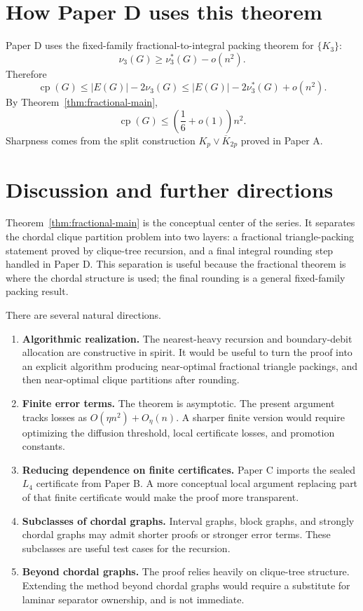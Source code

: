 \documentclass[11pt]{article}
\theoremstyle{definition}
\newcommand{\cp}{\operatorname{cp}}
\begin{document}
\section{How Paper D uses this theorem}

Paper D uses the fixed-family fractional-to-integral packing theorem for \(\{K_3\}\):
\[
    \nu_3(G)\ge\nu_3^*(G)-o(n^2).
\]
Therefore
\[
    \cp(G)
    \le
    |E(G)|-2\nu_3(G)
    \le
    |E(G)|-2\nu_3^*(G)+o(n^2).
\]
By Theorem~\ref{thm:fractional-main},
\[
    \cp(G)
    \le
    \left(\frac16+o(1)\right)n^2.
\]
Sharpness comes from the split construction \(K_p\vee\overline{K}_{2p}\) proved in Paper A.


\section{Discussion and further directions}

Theorem~\ref{thm:fractional-main} is the conceptual center of the series. It separates the chordal clique partition problem into two layers: a fractional triangle-packing statement proved by clique-tree recursion, and a final integral rounding step handled in Paper D. This separation is useful because the fractional theorem is where the chordal structure is used; the final rounding is a general fixed-family packing result.

There are several natural directions.

\begin{enumerate}[label=(\roman*)]
    \item \textbf{Algorithmic realization.} The nearest-heavy recursion and boundary-debit allocation are constructive in spirit. It would be useful to turn the proof into an explicit algorithm producing near-optimal fractional triangle packings, and then near-optimal clique partitions after rounding.
    \item \textbf{Finite error terms.} The theorem is asymptotic. The present argument tracks losses as \(O(\eta n^2)+O_\eta(n)\). A sharper finite version would require optimizing the diffusion threshold, local certificate losses, and promotion constants.
    \item \textbf{Reducing dependence on finite certificates.} Paper C imports the sealed \(L_4\) certificate from Paper B. A more conceptual local argument replacing part of that finite certificate would make the proof more transparent.
    \item \textbf{Subclasses of chordal graphs.} Interval graphs, block graphs, and strongly chordal graphs may admit shorter proofs or stronger error terms. These subclasses are useful test cases for the recursion.
    \item \textbf{Beyond chordal graphs.} The proof relies heavily on clique-tree structure. Extending the method beyond chordal graphs would require a substitute for laminar separator ownership, and is not immediate.
\end{enumerate}
\end{document}
